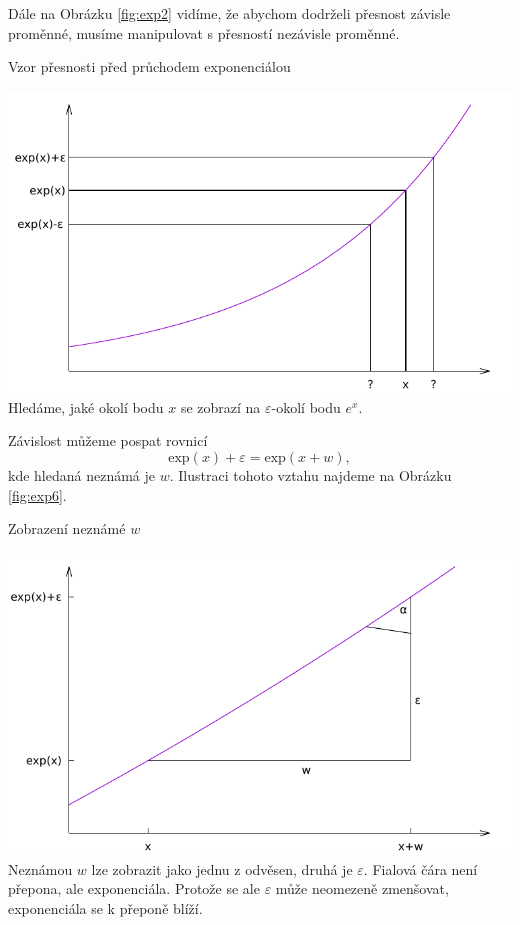 Dále na Obrázku \ref{fig:exp2} vidíme, že abychom dodrželi přesnost závisle proměnné, musíme manipulovat s přesností nezávisle proměnné.\begin{myfigure}{}
\caption{Vzor přesnosti před průchodem exponenciálou}
\includegraphics[width=\linewidth]{graphics/exp2.pdf}\label{fig:exp2}
Hledáme, jaké okolí bodu $x$ se zobrazí na $\varepsilon$-okolí bodu $e^x$.
\end{myfigure} Závislost můžeme pospat rovnicí
\begin{equation}\label{invpresexp}
\mathrm{exp}(x)+\varepsilon=\mathrm{exp}(x+w),
\end{equation}
kde hledaná neznámá je $w$. Ilustraci tohoto vztahu najdeme na Obrázku \ref{fig:exp6}.

\begin{myfigure}{}
\caption{Zobrazení neznámé $w$}
\includegraphics[width=\linewidth]{graphics/exp6.pdf}\label{fig:exp6}
Neznámou $w$ lze zobrazit jako jednu z odvěsen, druhá je $\varepsilon$. Fialová čára není přepona, ale exponenciála. Protože se ale $\varepsilon$ může neomezeně zmenšovat, exponenciála se k přeponě blíží.
\end{myfigure}


